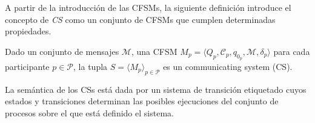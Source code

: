 A partir de la introducción de las CFSMs, la siguiente definición introduce el concepto de \emph{CS} como un conjunto de CFSMs que cumplen determinadas propiedades.

\begin{definition}\label{def:CS} Dado un conjunto de mensajes $\mathcal{M}$, una CFSM $\textit{M}_p = \langle Q_p, \mathcal{C}_p, q_{0_p}, \mathcal{M}, \delta_p \rangle$ para cada participante $p \in \mathcal{P}$, la tupla $S=\langle M_p \rangle_{p \in \mathcal{P}}$ es un communicating system (CS).
\end{definition}

La semántica de los CSs está dada por un sistema de transición etiquetado cuyos estados y transiciones determinan las posibles ejecuciones del conjunto de procesos sobre el que está definido el sistema.

